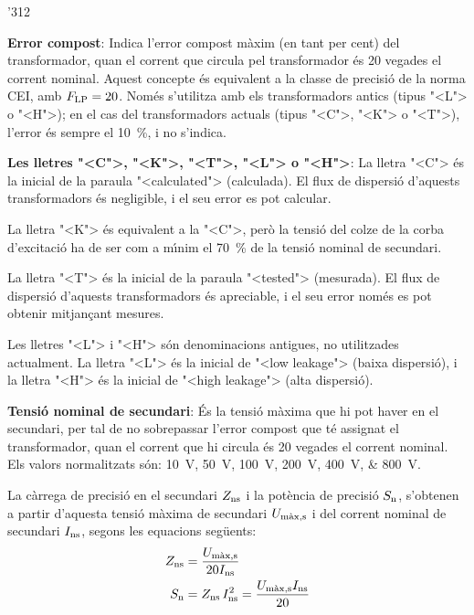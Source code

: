 \begin{dingautolist}{'312}
    \item \textbf{Error compost}: Indica l'error compost m\`{a}xim (en tant per cent) del
    transformador, quan el corrent que circula pel
    transformador \'{e}s 20 vegades el corrent nominal. Aquest concepte
     \'{e}s equivalent a la classe de precisi\'{o} de la norma \textsf{CEI},
     amb $F_\mathrm{LP}=20$. Nom\'{e}s s'utilitza amb els transformadors antics (tipus {"<}L{">} o {"<}H{">}); en el cas del transformadors actuals
     (tipus {"<}C{">}, {"<}K{">} o {"<}T{">}), l'error \'{e}s sempre el \SI{10}{\%}, i no s'indica.

    \item \textbf{Les lletres {"<}C{">}, {"<}K{">}, {"<}T{">}, {"<}L{">} o {"<}H{">}}: La lletra {"<}C{">} \'{e}s la inicial de la
    paraula  {"<}calculated{">} (calculada). El flux de dispersi\'{o} d'aquests transformadors \'{e}s negligible, i el seu error es pot calcular.

    La lletra {"<}K{">} \'{e}s equivalent a la {"<}C{">}, per\`{o} la tensi\'{o} del colze de la corba d'excitaci\'{o} ha de ser com a m\'{\i}nim el \SI{70}{\%}
    de la tensi\'{o} nominal de secundari.

    La lletra {"<}T{">} \'{e}s la inicial de la   paraula  {"<}tested{">} (mesurada). El flux de dispersi\'{o} d'aquests transformadors \'{e}s apreciable, i el seu error nom\'{e}s es pot obtenir mitjan\c{c}ant mesures.

    Les lletres {"<}L{">} i {"<}H{">} s\'{o}n denominacions antigues,  no utilitzades actualment. La lletra {"<}L{">} \'{e}s la inicial de {"<}low leakage{">} (baixa
    dispersi\'{o}), i la lletra {"<}H{">} \'{e}s la inicial de {"<}high leakage{">} (alta dispersi\'{o}).

    \item \textbf{Tensi\'{o} nominal de secundari}: \'{E}s la tensi\'{o} m\`{a}xima
    que hi pot haver en el secundari, per tal de no sobrepassar l'error compost que t\'{e}
    assignat el transformador, quan el corrent que hi circula
     \'{e}s 20 vegades el corrent nominal. Els valors
    normalitzats s\'{o}n: \SIlist{10; 50; 100; 200; 400; 800}{V}.

    La c\`{a}rrega de precisi\'{o} en el secundari
    $Z_\mathrm{ns}$ i la pot\`{e}ncia de precisi\'{o} $S_\mathrm{n}$, s'obtenen a partir d'aquesta
    tensi\'{o} m\`{a}xima de secundari $U_\mathrm{m\grave{a}x,s}$
    i del corrent     nominal de secundari $I_\mathrm{ns}$, segons les equacions seg\"{u}ents:
    \begin{align}
        Z_\mathrm{ns} &= \frac{U_\mathrm{m\grave{a}x,s}}{20 I_\mathrm{ns}}\\
        S_\mathrm{n} &= Z_\mathrm{ns} \,I_\mathrm{ns}^2 = \frac{U_\mathrm{m\grave{a}x,s} I_\mathrm{ns}}{20}
        \label{eq:sn_ti_ieee}
    \end{align}
\end{dingautolist}

